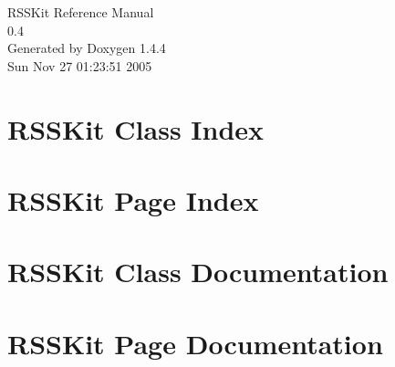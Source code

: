 \documentclass[a4paper]{book}
\begin{document}
\begin{titlepage}
\vspace*{7cm}
\begin{center}
{\Large RSSKit Reference Manual\\[1ex]\large 0.4 }\\
\vspace*{1cm}
{\large Generated by Doxygen 1.4.4}\\
\vspace*{0.5cm}
{\small Sun Nov 27 01:23:51 2005}\\
\end{center}
\end{titlepage}
\clearemptydoublepage
{}
\tableofcontents
\clearemptydoublepage
{}
\chapter{RSSKit Class Index}

\chapter{RSSKit Page Index}

\chapter{RSSKit Class Documentation}



\chapter{RSSKit Page Documentation}

\printindex
\end{document}
